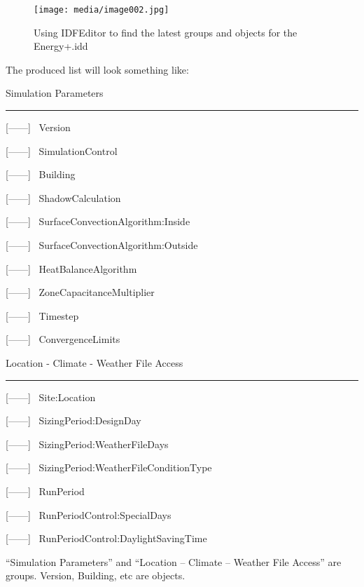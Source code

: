 \begin{figure}[hbtp] %
\centering
\texttt{[image: media/image002.jpg]}
\caption{Using IDFEditor to find the latest groups and objects for the Energy+.idd \protect \label{fig:using-idfeditor-to-find-the-latest-groups}}
\end{figure}

The produced list will look something like:

Simulation Parameters

\begin{center}\rule{0.5\linewidth}{0.4pt}\end{center}

{[}------{]}~ Version

{[}------{]}~ SimulationControl

{[}------{]}~ Building

{[}------{]}~ ShadowCalculation

{[}------{]}~ SurfaceConvectionAlgorithm:Inside

{[}------{]}~ SurfaceConvectionAlgorithm:Outside

{[}------{]}~ HeatBalanceAlgorithm

{[}------{]}~ ZoneCapacitanceMultiplier

{[}------{]}~ Timestep

{[}------{]}~ ConvergenceLimits

Location - Climate - Weather File Access

\begin{center}\rule{0.5\linewidth}{0.4pt}\end{center}

{[}------{]}~ Site:Location

{[}------{]}~ SizingPeriod:DesignDay

{[}------{]}~ SizingPeriod:WeatherFileDays

{[}------{]}~ SizingPeriod:WeatherFileConditionType

{[}------{]}~ RunPeriod

{[}------{]}~ RunPeriodControl:SpecialDays

{[}------{]}~ RunPeriodControl:DaylightSavingTime

``Simulation Parameters'' and ``Location -- Climate -- Weather File Access'' are groups. Version, Building, etc are objects.
